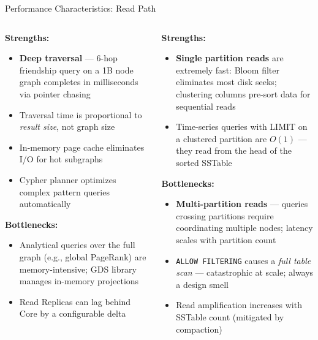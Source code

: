 \documentclass[aspectratio=169]{beamer}
\begin{document}
\begin{frame}{Performance Characteristics: Read Path}
  \begin{columns}[T]
      \begin{tcolorbox}[neo4jbox, title=Neo4j Read Performance]
        \small
        \textbf{Strengths:}
        \begin{itemize}\scriptsize
          \item \textbf{Deep traversal} — 6-hop friendship query on a 1B node graph completes in milliseconds via pointer chasing
          \item Traversal time is proportional to \textit{result size}, not graph size
          \item In-memory page cache eliminates I/O for hot subgraphs
          \item Cypher planner optimizes complex pattern queries automatically
        \end{itemize}
        \textbf{Bottlenecks:}
        \begin{itemize}\scriptsize
          \item Analytical queries over the full graph (e.g., global PageRank) are memory-intensive; GDS library manages in-memory projections
          \item Read Replicas can lag behind Core by a configurable delta
        \end{itemize}
      \end{tcolorbox}
      \begin{tcolorbox}[cassbox, title=Cassandra Read Performance]
        \small
        \textbf{Strengths:}
        \begin{itemize}\scriptsize
          \item \textbf{Single partition reads} are extremely fast: Bloom filter eliminates most disk seeks; clustering columns pre-sort data for sequential reads
          \item Time-series queries with LIMIT on a clustered partition are $O(1)$ — they read from the head of the sorted SSTable
        \end{itemize}
        \textbf{Bottlenecks:}
        \begin{itemize}\scriptsize
          \item \textbf{Multi-partition reads} — queries crossing partitions require coordinating multiple nodes; latency scales with partition count
          \item \texttt{ALLOW FILTERING} causes a \textit{full table scan} — catastrophic at scale; always a design smell
          \item Read amplification increases with SSTable count (mitigated by compaction)
        \end{itemize}
      \end{tcolorbox}
  \end{columns}
\end{frame}
\end{document}
